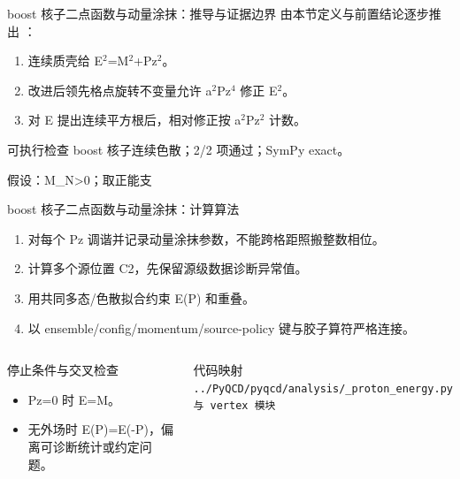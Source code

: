 \begin{frame}[t]{boost 核子二点函数与动量涂抹：推导与证据边界}
\footnotesize
{}\quad 由本节定义与前置结论逐步推出 ：
\begin{enumerate}
\item 连续质壳给 E\ensuremath{^{2}}=M\ensuremath{^{2}}+Pz\ensuremath{^{2}}。
\item 改进后领先格点旋转不变量允许 a\ensuremath{^{2}}Pz\ensuremath{^{4}} 修正 E\ensuremath{^{2}}。
\item 对 E 提出连续平方根后，相对修正按 a\ensuremath{^{2}}Pz\ensuremath{^{2}} 计数。
\end{enumerate}\begin{block}{可执行检查}
\quad boost 核子连续色散；2/2 项通过；SymPy exact。
\par\scriptsize 假设：M\_N>0；取正能支
\end{block}
\end{frame}

\begin{frame}[t]{boost 核子二点函数与动量涂抹：计算算法}
\footnotesize
{}\begin{enumerate}
\item 对每个 Pz 调谐并记录动量涂抹参数，不能跨格距照搬整数相位。
\item 计算多个源位置 C2，先保留源级数据诊断异常值。
\item 用共同多态/\allowbreak{}色散拟合约束 E(P) 和重叠。
\item 以 ensemble/\allowbreak{}config/\allowbreak{}momentum/\allowbreak{}source-policy 键与胶子算符严格连接。
\end{enumerate}\begin{columns}[T,onlytextwidth]
\begin{block}{停止条件与交叉检查}\scriptsize\begin{itemize}
\item[\CheckMark] Pz=0 时 E=M。
\item[\CheckMark] 无外场时 E(P)=E(-P)，偏离可诊断统计或约定问题。
\end{itemize}\end{block}
\begin{block}{代码映射}
\scriptsize \texttt{.\allowbreak{}.\allowbreak{}/\allowbreak{}PyQCD/\allowbreak{}pyqcd/\allowbreak{}analysis/\allowbreak{}\_\allowbreak{}proton\_\allowbreak{}energy.\allowbreak{}py 与 vertex 模块}
\end{block}\end{columns}\end{frame}

